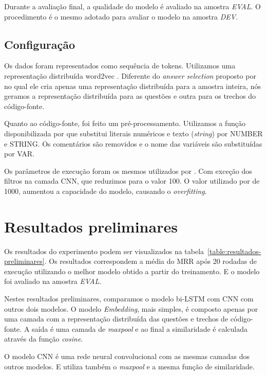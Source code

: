 \documentclass[12pt]{article}
\begin{document}
Durante a avaliação final, a qualidade do modelo é avaliado na amostra \emph{EVAL}. O procedimento é o mesmo adotado para avaliar o modelo na amostra \emph{DEV}.


\subsection{Configuração}

Os dados foram representados como sequência de tokens. Utilizamos uma representação distribuída word2vec \cite{mikolov-word2vec-2013}. Diferente do \textit{answer selection} proposto por \cite{tan-lstm-qa} no qual ele cria apenas uma representação distribuída para a amostra inteira, nós geramos a representação distribuída para as questões e outra para os trechos do código-fonte.

Quanto ao código-fonte, foi feito um pré-processamento. Utilizamos a função disponibilizada por \cite{Yao-staqc:2018} que substitui literais numéricos e texto (\textit{string}) por NUMBER e STRING. Os comentários são removidos e o nome das variáveis são substituídas por VAR.

Os parâmetros de execução foram os mesmos utilizados por \cite{tan-lstm-qa}. Com exceção dos filtros na camada CNN, que reduzimos para o valor 100. O valor utilizado por \cite{tan-lstm-qa} de 1000, aumentou a capacidade do modelo, causando o \textit{overfitting}.




\section{Resultados preliminares}\label{sec:resultados-preliminares}

Os resultados do experimento podem ser visualizados na tabela~\ref{table:resultados-preliminares}. Os resultados correspondem a média do MRR após 20 rodadas de execução utilizando o melhor modelo obtido a partir do treinamento. E o modelo foi avaliado na amostra \emph{EVAL}. 

Nestes resultados preliminares, comparamos o modelo bi-LSTM com CNN com outros dois modelos. O modelo \emph{Embedding}, mais simples, é composto apenas por uma camada com a representação distribuída das questões e trechos de código-fonte. A saída é uma camada de \textit{maxpool} e ao final a similaridade é calculada através da função \textit{cosine}. 

O modelo CNN é uma rede neural convolucional com as mesmas camadas dos outros modelos. E utiliza também o \textit{maxpool} e a mesma função de similaridade.
\end{document}
